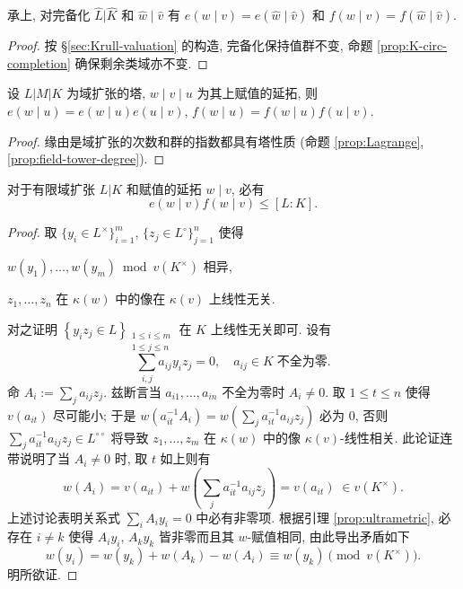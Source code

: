 \begin{proposition}\label{prop:ef-completion}
	承上, 对完备化 $\hat{L} | \hat{K}$ 和 $\hat{w} \mid \hat{v}$ 有 $e(w \mid v) = e(\hat{w} \mid \hat{v})$ 和 $f(w \mid v) = f(\hat{w} \mid \hat{v})$.
\end{proposition}
\begin{proof}
	按 \S\ref{sec:Krull-valuation} 的构造, 完备化保持值群不变, 命题 \ref{prop:K-circ-completion} 确保剩余类域亦不变.
\end{proof}

\begin{proposition}\label{prop:e-f-tower}
	设 $L|M|K$ 为域扩张的塔, $w \mid v \mid u$ 为其上赋值的延拓, 则 $e(w \mid u) = e(w \mid u)e(u \mid  v)$, $f(w \mid u) = f(w \mid u)f(u \mid  v)$.
\end{proposition}
\begin{proof}
	缘由是域扩张的次数和群的指数都具有塔性质 (命题 \ref{prop:Lagrange}, \ref{prop:field-tower-degree}).
\end{proof}

\begin{proposition}\label{prop:fundamental-ineq}
	对于有限域扩张 $L|K$ 和赋值的延拓 $w \mid v$, 必有
	\[ e(w \mid v) f(w \mid v) \leq [L:K]. \]
\end{proposition}
\begin{proof}
	取 $\{y_i \in L^\times\}_{i=1}^m$, $\{z_j \in L^\circ \}_{j=1}^n$ 使得
	\begin{compactitem}
		\item $w(y_1), \ldots, w(y_m) \bmod v(K^\times)$ 相异,
		\item $z_1, \ldots, z_n$ 在 $\kappa(w)$ 中的像在 $\kappa(v)$ 上线性无关.
	\end{compactitem}
	对之证明 $\left\{ y_i z_j \in L \right\}_{\substack{1 \leq i \leq m \\ 1 \leq j \leq n}}$ 在 $K$ 上线性无关即可. 设有
	\[ \sum_{i,j} a_{ij} y_i z_j = 0, \quad a_{ij} \in K\; \text{不全为零}. \]
	命 $A_i := \sum_j a_{ij} z_j$. 兹断言当 $a_{i1}, \ldots, a_{in}$ 不全为零时 $A_i \neq 0$. 取 $1 \leq t \leq n$ 使得 $v(a_{it})$ 尽可能小; 于是 $w\left( a_{it}^{-1} A_i \right) = w\left( \sum_j a_{it}^{-1} a_{ij} z_j \right)$ 必为 $0$, 否则 $\sum_j a_{it}^{-1} a_{ij} z_j \in L^{\circ\circ}$ 将导致 $z_1, \ldots, z_m$ 在 $\kappa(w)$ 中的像 $\kappa(v)$-线性相关. 此论证连带说明了当 $A_i \neq 0$ 时, 取 $t$ 如上则有
	\[ w(A_i) = v(a_{it}) + w\left( \sum_j a_{it}^{-1} a_{ij} z_j \right) = v(a_{it}) \;\in v(K^\times). \]
	上述讨论表明关系式 $\sum_i A_i y_i = 0$ 中必有非零项. 根据引理 \ref{prop:ultrametric}, 必存在 $i \neq k$ 使得 $A_i y_i$, $A_k y_k$ 皆非零而且其 $w$-赋值相同, 由此导出矛盾如下
	\[ w(y_i) = w(y_k) + w(A_k) - w(A_i) \equiv w(y_k) \pmod {v(K^\times)}. \]
	明所欲证.
\end{proof}

